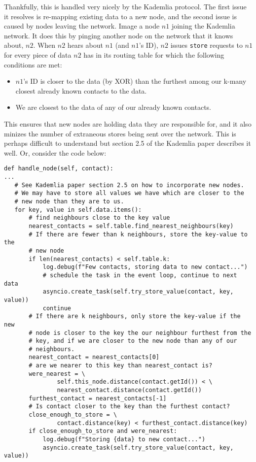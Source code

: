 \documentclass[12pt]{report}
\newcommand{\code}[1]{\colorbox{codegray}{\texttt{#1}}}
\begin{document}
\begin{itemize}
            Thankfully, this is handled very nicely by the Kademlia protocol.
            The first issue it resolves is re-mapping existing data to a new
            node, and the second issue is caused by nodes leaving the network.
            Image a node $n1$ joining the Kademlia network.  It does this by
            pinging another node on the network that it knows about, $n2$.
            When $n2$ hears about $n1$ (and $n1$'s ID), $n2$ issues
            \code{store} requests to $n1$ for every piece of data $n2$ has in
            its routing table for which the following conditions are met:
            \begin{itemize}
                \item $n1$'s ID is closer to the data (by XOR) than the
                    furthest among our k-many closest already known contacts to
                    the data.
                \item We are closest to the data of any of our already known
                    contacts.
            \end{itemize}
            This ensures that new nodes are holding data they are responsible
            for, and it also minizes the number of extraneous stores being sent
            over the network.  This is perhaps difficult to understand but
            section 2.5 of the Kademlia paper describes it well.  Or, consider
            the code below:
\begin{lstlisting}[label=handle_node]
def handle_node(self, contact):
...
   # See Kademlia paper section 2.5 on how to incorporate new nodes.
   # We may have to store all values we have which are closer to the
   # new node than they are to us.
   for key, value in self.data.items():
       # find neighbours close to the key value
       nearest_contacts = self.table.find_nearest_neighbours(key)
       # If there are fewer than k neighbours, store the key-value to the
       # new node
       if len(nearest_contacts) < self.table.k:
           log.debug(f"Few contacts, storing data to new contact...")
           # schedule the task in the event loop, continue to next data
           asyncio.create_task(self.try_store_value(contact, key, value))
           continue
       # If there are k neighbours, only store the key-value if the new
       # node is closer to the key the our neighbour furthest from the
       # key, and if we are closer to the new node than any of our
       # neighbours.
       nearest_contact = nearest_contacts[0]
       # are we nearer to this key than nearest_contact is?
       were_nearest = \
               self.this_node.distance(contact.getId()) < \
               nearest_contact.distance(contact.getId())
       furthest_contact = nearest_contacts[-1]
       # Is contact closer to the key than the furthest contact?
       close_enough_to_store = \
               contact.distance(key) < furthest_contact.distance(key) 
       if close_enough_to_store and were_nearest:
           log.debug(f"Storing {data} to new contact...")
           asyncio.create_task(self.try_store_value(contact, key, value))


\end{lstlisting}
\end{itemize}
\end{document}

